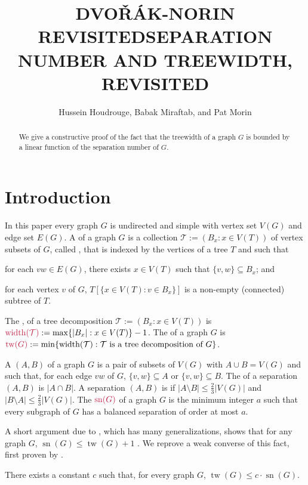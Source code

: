 \documentclass{patmorin}
\title{\MakeUppercase{Dvo\v{r}ák-Norin Revisited}}
\title{\MakeUppercase{Separation Number and Treewidth, Revisited}}
\author{Hussein Houdrouge, Babak Miraftab, and Pat Morin}
\date{}
\DeclareMathOperator{\sep}{sn}
\DeclareMathOperator{\tw}{tw}
\DeclareMathOperator{\width}{width}
\begin{document}
\maketitle

\begin{abstract}
  We give a constructive proof of the fact that the treewidth of a graph $G$ is bounded by a linear function of the separation number of $G$.
\end{abstract}


\section{Introduction}

In this paper every graph $G$ is undirected and simple with vertex set $V(G)$ and edge set $E(G)$.  A  of a graph $G$ is a collection $\mathcal{T}:=(B_x:x\in V(T))$ of vertex subsets of $G$, called , that is indexed by the vertices of a tree $T$ and such that
\begin{enumerate*}[label=(\roman*)]
  \item\label{covers_edges} for each $vw\in E(G)$, there exists $x\in V(T)$ such that $\{v,w\}\subseteq B_x$; and
  \item\label{connectivity} for each vertex $v$ of $G$, $T[\{x\in V(T): v\in B_x\}]$ is a non-empty (connected) subtree of $T$.
\end{enumerate*}
The , of a tree decomposition $\mathcal{T}:=(B_x:x\in V(T))$ is $\mathdefin{\width(\mathcal{T})}:=\max\{|B_x|:x\in V(T)\}-1$. The  of a graph $G$ is $\mathdefin{\tw(G)}:=\min\{\width(\mathcal{T}):\text{$\mathcal{T}$ is a tree decomposition of $G$}\}$.

A  $(A,B)$ of a graph $G$ is a pair of subsets of $V(G)$ with $A\cup B= V(G)$ and such that, for each edge $vw$ of $G$, $\{v,w\}\subseteq A$ or $\{v,w\}\subseteq B$.  The  of a separation $(A,B)$ is $|A\cap B|$.  A separation $(A,B)$ is  if $|A\setminus B|\le \tfrac{2}{3}|V(G)|$ and $|B\setminus A|\le \tfrac{2}{3}|V(G)|$.  The  $\mathdefin{\sep(G)}$ of a graph $G$ is the minimum integer $a$ such that every subgraph of $G$ has a balanced separation of order at most $a$.

A short argument due to \citet{robertson.seymour:graph}, which has many generalizations, shows that for any graph $G$, $\sep(G)\le \tw(G)+1$ .  We reprove a weak converse of this fact, first proven by \citet{dvorak.norin:treewidth}.
\begin{thm}\label{main_result}
  There exists a constant $c$ such that, for every graph $G$, $\tw(G)\le c\cdot \sep(G)$.
\end{thm}
\end{document}
